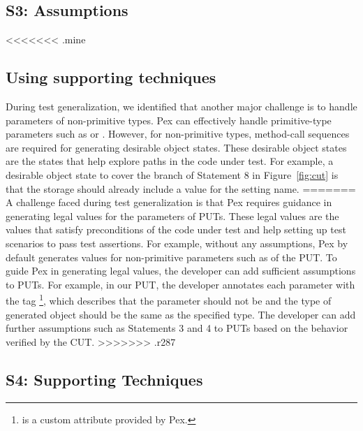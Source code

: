 \subsection{S3: Assumptions}

<<<<<<< .mine
\subsection{Using supporting techniques} During test generalization, we identified that another major challenge is to handle parameters of non-primitive types. Pex can effectively handle primitive-type parameters such as  or . However, for non-primitive types, method-call sequences are required for generating desirable object states. These desirable object states are the states that help explore paths in the code under test. For example, a desirable object state to cover the  branch of Statement 8 in Figure~\ref{fig:cut} is that the storage should already include a value for the setting name. 
=======
A challenge faced during test generalization is that Pex requires guidance in generating legal values for the parameters of PUTs. These legal values are the values that satisfy preconditions of the code under test and help setting up test scenarios to pass test assertions. For example, without any assumptions, Pex by default generates  values for non-primitive parameters such as  of the PUT. To guide Pex in generating legal values, the developer can add sufficient assumptions to PUTs. For example, in our PUT, the developer annotates each parameter with the tag \footnote{ is a custom attribute provided by Pex.}, which describes that the parameter should not be  and the type of generated object should be the same as the specified type. The developer can add further assumptions such as Statements 3 and 4 to PUTs based on the behavior verified by the CUT.
>>>>>>> .r287

\subsection{S4: Supporting Techniques}

